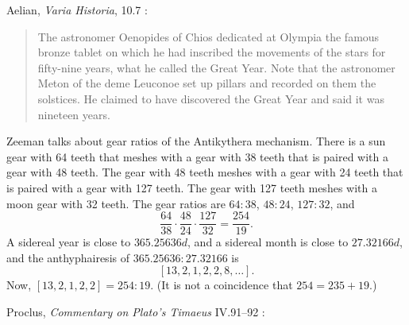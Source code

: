 \documentclass{article}
\begin{document}
Aelian, {\em Varia Historia}, 10.7 \cite[p.~319]{aelian}:

\begin{quote}
The astronomer Oenopides of Chios dedicated at Olympia
the famous bronze tablet on which he had inscribed the movements
of the stars for fifty-nine years, what he called the Great Year.
Note that the astronomer Meton of the deme Leuconoe set up
pillars and recorded on them the solstices. He claimed to have discovered
the Great Year and said it was nineteen years.
\end{quote}


Zeeman \cite{zeeman} talks about gear ratios of
the Antikythera mechanism. There is a sun gear with 64 teeth that meshes with a gear
with 38 teeth that is paired with a gear with 48 teeth. The gear with 48 teeth meshes with a gear with
24 teeth that is paired with a gear with 127 teeth. The gear with 127 teeth meshes with a moon gear
with 32 teeth. The gear ratios are 
$64:38$, $48:24$, $127:32$, and 
\[
\frac{64}{38} \cdot \frac{48}{24} \cdot \frac{127}{32} = \frac{254}{19}.
\]
A sidereal year is close to $365.25636d$, and a sidereal month is close to $27.32166d$,
and the anthyphairesis of $365.25636:27.32166$ is
\[
[13,2,1,2,2,8,\ldots].
\]
Now, $[13,2,1,2,2] = 254:19$. 
(It is not a coincidence that $254=235+19$.)

Proclus, {\em Commentary on Plato's Timaeus} IV.91--92 \cite[pp.~169--170]{timaeum4}:
\end{document}
